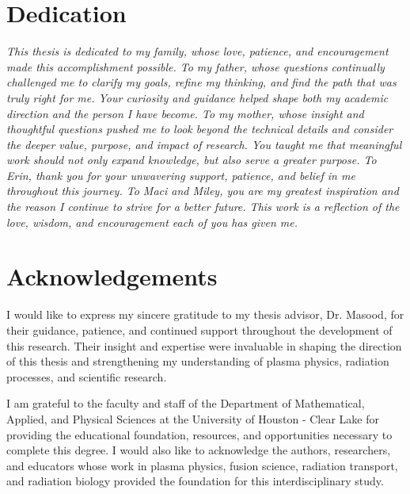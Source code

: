\documentclass[12pt,oneside]{report}
\theoremstyle{definition}
\begin{document}
\vspace{.2in}



\chapter*{Dedication}
\begin{center}
\emph{This thesis is dedicated to my family, whose love, patience, and encouragement made this accomplishment possible.
To my father, whose questions continually challenged me to clarify my goals, refine my thinking, and find the path that was truly right for me. Your curiosity and guidance helped shape both my academic direction and the person I have become.
To my mother, whose insight and thoughtful questions pushed me to look beyond the technical details and consider the deeper value, purpose, and impact of research. You taught me that meaningful work should not only expand knowledge, but also serve a greater purpose.
To Erin, thank you for your unwavering support, patience, and belief in me throughout this journey. To Maci and Miley, you are my greatest inspiration and the reason I continue to strive for a better future.
This work is a reflection of the love, wisdom, and encouragement each of you has given me.
}
\end{center}
\clearpage

\chapter*{Acknowledgements}
I would like to express my sincere gratitude to my thesis advisor, Dr. Masood, for their guidance, patience, and continued support throughout the development of this research. Their insight and expertise were invaluable in shaping the direction of this thesis and strengthening my understanding of plasma physics, radiation processes, and scientific research.

I am grateful to the faculty and staff of the Department of Mathematical, Applied, and Physical Sciences at the University of Houston - Clear Lake for providing the educational foundation, resources, and opportunities necessary to complete this degree. I would also like to acknowledge the authors, researchers, and educators whose work in plasma physics, fusion science, radiation transport, and radiation biology provided the foundation for this interdisciplinary study.
\end{document}
